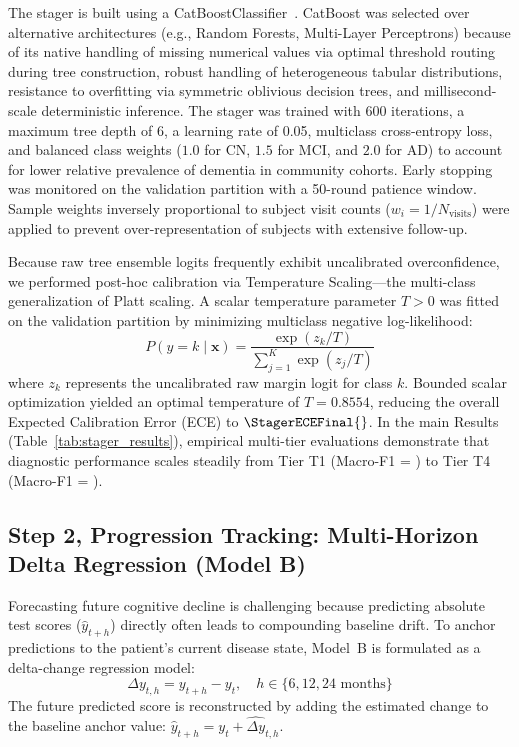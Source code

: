 The stager is built using a CatBoostClassifier~\cite{prokhorenkova2018catboost}. CatBoost was selected over alternative architectures (e.g., Random Forests, Multi-Layer Perceptrons) because of its native handling of missing numerical values via optimal threshold routing during tree construction, robust handling of heterogeneous tabular distributions, resistance to overfitting via symmetric oblivious decision trees, and millisecond-scale deterministic inference. The stager was trained with 600 iterations, a maximum tree depth of 6, a learning rate of 0.05, multiclass cross-entropy loss, and balanced class weights ($1.0$ for CN, $1.5$ for MCI, and $2.0$ for AD) to account for lower relative prevalence of dementia in community cohorts. Early stopping was monitored on the validation partition with a 50-round patience window. Sample weights inversely proportional to subject visit counts ($w_i = 1 / N_{\text{visits}}$) were applied to prevent over-representation of subjects with extensive follow-up.

Because raw tree ensemble logits frequently exhibit uncalibrated overconfidence, we performed post-hoc calibration via Temperature Scaling—the multi-class generalization of Platt scaling. A scalar temperature parameter $T > 0$ was fitted on the validation partition by minimizing multiclass negative log-likelihood:
\begin{equation}
    P(y = k \mid \mathbf{x}) = \frac{\exp(z_k / T)}{\sum_{j=1}^{K} \exp(z_j / T)}
\end{equation}
where $z_k$ represents the uncalibrated raw margin logit for class $k$. Bounded scalar optimization yielded an optimal temperature of $T = 0.8554$, reducing the overall Expected Calibration Error (ECE) to $\StagerECEFinal{}$. In the main Results (Table~\ref{tab:stager_results}), empirical multi-tier evaluations demonstrate that diagnostic performance scales steadily from Tier T1 (Macro-F1 = \StagerTOneFOne{}) to Tier T4 (Macro-F1 = \StagerTFourFOne{}).

\subsection{Step 2, Progression Tracking: Multi-Horizon Delta Regression (Model B)}
Forecasting future cognitive decline is challenging because predicting absolute test scores ($\hat{y}_{t+h}$) directly often leads to compounding baseline drift. To anchor predictions to the patient's current disease state, Model~B is formulated as a delta-change regression model:
\begin{equation}
    \Delta y_{t, h} = y_{t+h} - y_t, \quad h \in \{6, 12, 24\text{ months}\}
\end{equation}
The future predicted score is reconstructed by adding the estimated change to the baseline anchor value: $\hat{y}_{t+h} = y_t + \widehat{\Delta y}_{t, h}$.

